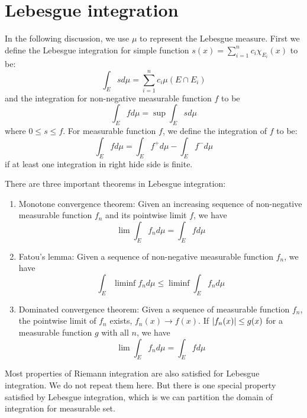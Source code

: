\section{Lebesgue integration}
In the following discussion, we use $\mu$ to represent the Lebesgue measure. First we define the Lebesgue integration for simple function $s(x)=\sum_{i=1}^n c_i\chi_{E_i}(x)$ to be:
\begin{equation*}
    \int_{E}s d\mu=\sum_{i=1}^n c_i\mu(E\cap E_i)
\end{equation*}
and the integration for non-negative measurable function $f$ to be 
\begin{equation*}
    \int_{E}f d\mu=\sup \int_{E}s d\mu
\end{equation*}
where $0\leq s\leq f$. For measurable function $f$, we define the integration of $f$ to be:
\begin{equation*}
    \int_{E}f d\mu=\int_{E}f^+ d\mu-\int_{E}f^- d\mu
\end{equation*}
if at least one integration in right hide side is finite.\par
There are three important theorems in Lebesgue integration:
\begin{enumerate}
    \item Monotone convergence theorem: Given an increasing sequence of non-negative measurable function $f_n$ and its pointwise limit $f$, we have 
    \begin{equation*}
        \lim\int_{E}{f_nd\mu}=\int_{E}{fd\mu}
    \end{equation*}
    
    \item Fatou's lemma: Given a sequence of non-negative measurable function $f_n$, we have 
    \begin{equation*}
        \int_{E}{\liminf f_n d\mu}\leq \liminf \int_{E}{f_nd\mu}
    \end{equation*}
    \item Dominated convergence theorem: Given a sequence of measurable function $f_n$, the pointwise limit of $f_n$ exists, $f_n(x)\to f(x)$. If $\left\lvert f_n(x)\right\rvert\leq g(x)$ for a measurable function $g$ with all $n$, we have
    \begin{equation*}
        \lim\int_{E}{f_n d\mu}=\int_{E}{fd\mu}
    \end{equation*}
\end{enumerate}\par
Most properties of Riemann integration are also satisfied for Lebesgue integration. We do not repeat them here. But there is one special property satisfied by Lebesgue integration, which is we can partition the domain of integration for measurable set.\par
